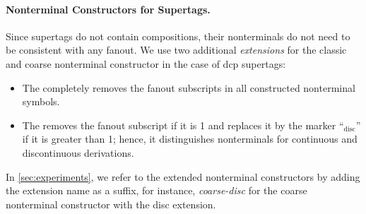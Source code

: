 \documentclass[../../document.tex]{subfiles}
\begin{document}
    \paragraph{Nonterminal Constructors for  Supertags.}
    Since  supertags do not contain  compositions, their nonterminals do not need to be consistent with any fanout.
    We use two additional \emph{extensions} for the classic and coarse nonterminal constructor in the case of dcp supertags:
    \begin{itemize}
        \item The  completely removes the fanout subscripts in all constructed nonterminal symbols.
        \item The  removes the fanout subscript if it is 1 and replaces it by the marker ``$_{\text{disc}}$'' if it is greater than 1; hence, it distinguishes nonterminals for continuous and discontinuous derivations.
    \end{itemize}
    In \cref{sec:experiments}, we refer to the extended nonterminal constructors by adding the extension name as a suffix, for instance, \emph{coarse-disc} for the coarse nonterminal constructor with the disc extension.
\end{document}
